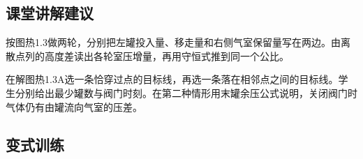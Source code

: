 \documentclass[UTF8,fontset=fandol,a4paper,11pt]{ctexart}
\begin{document}
\subsection*{课堂讲解建议}

按图热1.3做两轮，分别把左罐投入量、移走量和右侧气室保留量写在两边。由离散点列的高度差读出各轮室压增量，再用守恒式推到同一个公比。

在解图热1.3A选一条恰穿过点的目标线，再选一条落在相邻点之间的目标线。学生分别给出最少罐数与阀门时刻。在第二种情形用末罐余压公式说明，关闭阀门时气体仍有由罐流向气室的压差。




\subsection*{变式训练}
\end{document}
